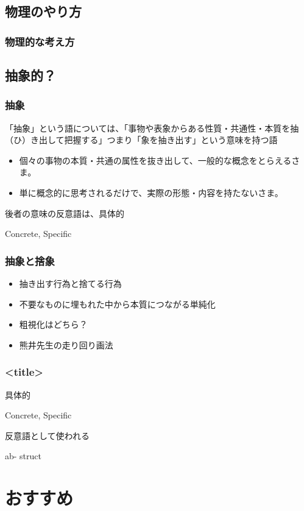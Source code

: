 \documentclass[12pt, dvipdfmx]{beamer}
\begin{document}
\subsection{物理のやり方}
\begin{frame}
    \frametitle{物理的な考え方}

\end{frame}

\subsection{抽象的？}
\begin{frame}
    \frametitle{抽象}

    「抽象」という語については、「事物や表象からある性質・共通性・本質を抽（ひ）き出して把握する」つまり「象を抽き出す」という意味を持つ語


    \begin{itemize}
        \item 個々の事物の本質・共通の属性を抜き出して、一般的な概念をとらえるさま。
        \item 単に概念的に思考されるだけで、実際の形態・内容を持たないさま。
    \end{itemize}

    後者の意味の反意語は、具体的

    Concrete, Specific

\end{frame}

\begin{frame}
    \frametitle{抽象と捨象}
    \begin{itemize}
        \item 抽き出す行為と捨てる行為
        \item 不要なものに埋もれた中から本質につながる単純化
        \item 粗視化はどちら？
        \item 熊井先生の走り回り画法
    \end{itemize}
\end{frame}


\begin{frame}
    \frametitle{<title>}

    具体的

    Concrete, Specific


    反意語として使われる

    ab-
    struct


\end{frame}
\section{おすすめ}
\end{document}
